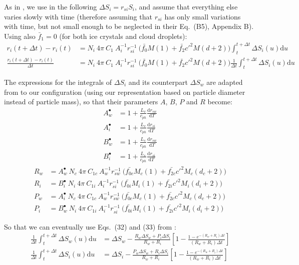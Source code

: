 {As in \citet{Reisin1996}, we use in the following $\Delta S_i = r_{si} S_i$, and assume that everything else varies slowly with time (therefore assuming that $r_{si}$ has only small variations with time, but not small enough to be neglected in their Eq.\ (B5), Appendix B). Using also $\bar{f}_1=0$ (for both ice crystals and cloud droplets):
\begin{align}
 r_i(t + \Delta t) - r_i(t) &= N_i ~ 4\pi ~ C_1 ~ A_i^{-1} r_{si}^{-1} ~ \Bigg( \bar{f_0} M(1) + \bar{f_2} c'^2 M(d+2) \Bigg) \int_t^{t + \Delta t} \Delta S_i(u) \mathrm{d}u \\
 \frac{r_i(t + \Delta t) - r_i(t)}{\Delta t} &= N_i ~ 4\pi ~ C_1 ~ A_i^{-1} r_{si}^{-1} ~ \Bigg( \bar{f_0} M(1) + \bar{f_2} c'^2 M(d+2) \Bigg) \frac{1}{\Delta t} \int_t^{t + \Delta t} \Delta S_i(u) \mathrm{d}u \label{update-ri}
\end{align}

The expressions for the integrals of $\Delta S_i$ and its counterpart $\Delta S_w$ are adapted from \citet{Reisin1996} to our configuration (using our representation based on particle diameter instead of particle mass), so that their parameters $A$, $B$, $P$ and $R$ become:
\begin{align}
 A_w^\bullet &= 1 + \frac{L_v}{c_{ph}} \frac{\mathrm{d}r_{sw}}{\mathrm{d}T} \\
 A_i^\bullet &= 1 + \frac{L_v}{c_{ph}} \frac{\mathrm{d}r_{si}}{\mathrm{d}T} \\
 B_w^\bullet &= 1 + \frac{L_s}{c_{ph}} \frac{\mathrm{d}r_{sw}}{\mathrm{d}T} \\
 B_i^\bullet &= 1 + \frac{L_s}{c_{ph}} \frac{\mathrm{d}r_{si}}{\mathrm{d}T}
\end{align}
\begin{align}
 R_w &= A_w^\bullet ~ N_c ~ 4\pi ~ C_{1c} ~ A_w^{-1} r_{sw}^{-1} ~ \Bigg( \bar{f_{0c}} M_c(1) + \bar{f_{2c}} c'^2 M_c(d_c+2) \Bigg) \\
 R_i &= B_i^\bullet ~ N_i ~ 4\pi ~ C_{1i} ~ A_i^{-1} r_{si}^{-1} ~ \Bigg( \bar{f_{0i}} M_i(1) + \bar{f_{2i}} c'^2 M_i(d_i+2) \Bigg) \\
 P_w &= A_i^\bullet ~ N_c ~ 4\pi ~ C_{1c} ~ A_w^{-1} r_{sw}^{-1} ~ \Bigg( \bar{f_{0c}} M_c(1) + \bar{f_{2c}} c'^2 M_c(d_c+2) \Bigg) \\
 P_i &= B_w^\bullet ~ N_i ~ 4\pi ~ C_{1i} ~ A_i^{-1} r_{si}^{-1} ~ \Bigg( \bar{f_{0i}} M_i(1) + \bar{f_{2i}} c'^2 M_i(d_i+2) \Bigg) 
\end{align}

So that we can eventually use Eqs.\ (32) and (33) from \citet{Reisin1996}:
\begin{align}
 \frac{1}{\Delta t} \int_t^{t + \Delta t} \Delta S_w(u) \mathrm{d}u &= \Delta S_w - \frac{R_w \Delta S_w + P_i \Delta S_i}{R_w + R_i} \left[ 1 - \frac{1 - e^{-(R_w + R_i)\Delta t}}{(R_w + R_i)\Delta t} \right] \\
 \frac{1}{\Delta t} \int_t^{t + \Delta t} \Delta S_i(u) \mathrm{d}u &= \Delta S_i - \frac{P_w \Delta S_w + R_i \Delta S_i}{R_w + R_i} \left[ 1 - \frac{1 - e^{-(R_w + R_i)\Delta t}}{(R_w + R_i)\Delta t} \right] \label{DeltaSi}
\end{align}

}
